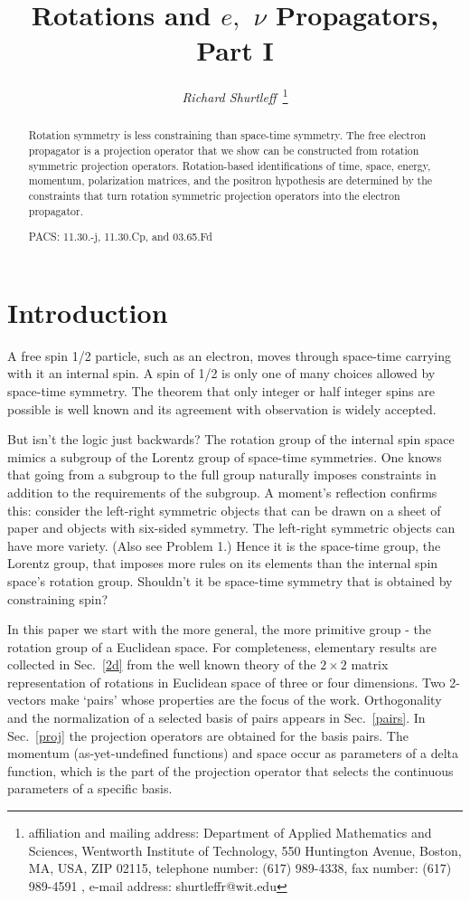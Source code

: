 \documentclass[a4paper,12pt]{article}
\title{ Rotations and $e,$ $\nu$ Propagators, Part I}
\author{{\it Richard Shurtleff~}\thanks{affiliation and mailing 
address: Department of Applied Mathematics and Sciences, 
Wentworth Institute of Technology, 550 Huntington Avenue, 
Boston, MA, USA, ZIP 02115, telephone number: (617) 989-4338, fax 
number: (617) 989-4591 , e-mail address: shurtleffr@wit.edu}}
\begin{document}
 
          
\maketitle               
			\begin{abstract}  

Rotation symmetry is less constraining than space-time symmetry. The free electron propagator is a projection operator that we show can be constructed from rotation symmetric projection operators. Rotation-based identifications of time, space, energy, momentum, polarization matrices, and the positron hypothesis are determined by the constraints that turn rotation symmetric projection operators into the electron propagator. 

	PACS: 11.30.-j, 11.30.Cp, and 03.65.Fd 
 
\end{abstract}

\pagebreak

\section{Introduction} \label{intro} %

	A free spin 1/2 particle, such as an electron, moves through space-time carrying with it an internal spin. A spin of 1/2 is only one of many choices allowed by space-time symmetry. The theorem that only integer or half integer spins are possible is well known \cite{wigner} and its agreement with observation is widely accepted.

	But isn't the logic just backwards? The rotation group of the internal spin space mimics a subgroup of the Lorentz group of space-time symmetries. One knows that going from a subgroup to the full group naturally imposes constraints in addition to the requirements of the subgroup. A moment's reflection confirms this: consider the left-right symmetric objects that can be drawn on a sheet of paper and objects with six-sided symmetry. The left-right symmetric objects can have more variety. (Also see Problem 1.) Hence it is the space-time group, the Lorentz group, that imposes more rules on its elements than the internal spin space's rotation group. Shouldn't it be space-time symmetry that is obtained by constraining spin?

	In this paper we start with the more general, the more primitive group - the rotation group of a Euclidean space. For completeness, elementary results are collected in Sec.~\ref{2d} from the well known theory of the $2 \times 2$ matrix representation of rotations in Euclidean space of three or four dimensions. Two 2-vectors make `pairs' whose properties are the focus of the work. Orthogonality and the normalization of a selected basis of pairs appears in Sec.~\ref{pairs}. In Sec.~\ref{proj} the projection operators are obtained for the basis pairs. The momentum (as-yet-undefined functions) and space occur as parameters of a delta function, which is the part of the projection operator that selects the continuous parameters of a specific basis. 
\end{document}

